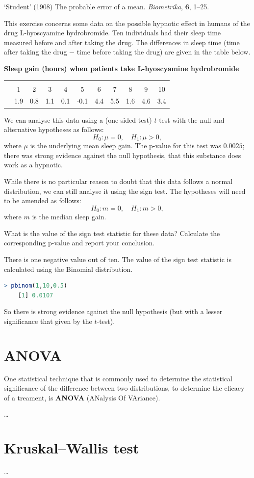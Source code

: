 \begin{marginnoteblock}
    `Student' (1908) The probable error of a mean.
	\emph{Biometrika}, \textbf{6}, 1--25.
\end{marginnoteblock}
\begin{exercises}
  This exercise concerns some data on the possible hypnotic effect in humans of the drug L-hyoscyamine hydrobromide.
  Ten individuals had their sleep time measured before and after taking the drug.
  The differences in sleep time (time after taking the drug $-$ time before taking the drug) are given in the table below.

  \textbf{Sleep gain (hours) when patients take L-hyoscyamine hydrobromide}\\
  \begin{tabular}{lcccccccccc}
	                     &     &     &     &     &      &     &     &     &     &     \\
	\text{Patient}  & 1   & 2   & 3   & 4   & 5    & 6   & 7   & 8   & 9   & 10  \\
	\text{Gain} & 1.9 & 0.8 & 1.1 & 0.1 & -0.1 & 4.4 & 5.5 & 1.6 & 4.6 & 3.4 \\
  \end{tabular}
  
  We can analyse this data using a (one-sided test) $t$-test with the null and alternative hypotheses as follows:
  $$H_0: \mu = 0,\quad H_1: \mu > 0,$$
  where $\mu$ is the underlying mean sleep gain.
  The p-value for this test was $0.0025$; there was strong evidence against the null hypothesis, that this substance does work as a hypnotic.
  
  While there is no particular reason to doubt that this data follows a normal distribution, we can still analyse it using the sign test.
  The hypotheses will need to be amended as follows:
  $$H_0: m = 0,\quad H_1: m > 0,$$
  where $m$ is the median sleep gain.

  \question What is the value of the sign test statistic for these data? Calculate the corresponding p-value and report your conclusion.

  \solution There is one negative value out of ten.
  The value of the sign test statistic is calculated using the Binomial distribution.
  \begin{lstlisting}[language=R]
    > pbinom(1,10,0.5)
    [1] 0.0107
  \end{lstlisting}
  So there is strong evidence against the null hypothesis (but with a lesser significance that given by the $t$-test).
\end{exercises}

\section{ANOVA}

One statistical technique that is commonly used to determine the statistical significance of the difference between two distributions, to determine the eficacy of a treament, is \textbf{ANOVA} (ANalysis Of VAriance).

\ldots

\section{Kruskal–Wallis test}

\ldots
